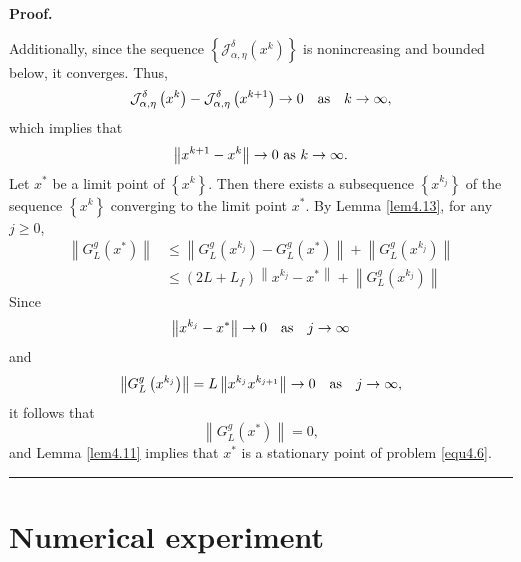 \documentclass[a4paper,12pt]{article}
\numberwithin{equation}{section}
\newenvironment{proof}[1][Proof]{\textbf{#1.} }
{\ \rule{0.75em}{0.75em}\smallskip}
\begin{document}
\begin{proof}
    \par Additionally, since the sequence $\left\{\mathcal{J}_{\alpha,\eta}^{\delta}\left(x^{k}\right)\right\}$ is nonincreasing and bounded below, it converges. Thus, 
    \begin{equation*}
        \mathcal{J}_{\alpha,\eta}^{\delta}\left(x^{k}\right)- \mathcal{J}_{\alpha,\eta}^{\delta}\left(x^{k+1}\right)\rightarrow 0\quad {\rm as}\quad  k\rightarrow \infty,
    \end{equation*}
    which implies that 
    \begin{equation*}
        \left\|x^{k+1}-x^{k}\right\|\rightarrow 0\ {\rm as}\ k\rightarrow\infty.
    \end{equation*}
    Let $x^{*}$ be a limit point of $\left\{x^{k}\right\}$. Then there exists a subsequence $\left\{x^{k_{j}}\right\}$ of the sequence $\left\{x^{k}\right\}$ converging to the limit point $x^{*}$. By Lemma \ref{lem4.13}, for any $j\geq 0$,
    \begin{align*}
        \left\|G_{L}^{g}\left(x^{*}\right)\right\|
        & \leq \left\|G_{L}^{g}\left(x^{k_{j}}\right)-G_{L}^{g}\left(x^{*}\right)\right\|+ \left\|G_{L}^{g}\left(x^{k_{j}}\right)\right\| \\
        & \leq \left(2L+L_{f}\right)\left\|x^{k_{j}}-x^{*}\right\| +\left\|G_{L}^{g}\left(x^{k_{j}}\right)\right\|
    \end{align*}
    Since 
    \begin{equation*}
        \left\|x^{k_{j}}-x^{*}\right\|\rightarrow 0\quad {\rm as}\quad j\rightarrow\infty
    \end{equation*}
    and 
    \begin{equation*}
        \left\|G_{L}^{g}\left(x^{k_{j}}\right)\right\|=L\left\|x^{k_{j}}x^{k_{j+1}}\right\| \rightarrow 0\quad {\rm as}\quad j\rightarrow\infty,
    \end{equation*}
    it follows that 
    \begin{equation*}
        \left\|G_{L}^{g}\left(x^{*}\right)\right\|=0,
    \end{equation*}
    and Lemma \ref{lem4.11} implies that $x^{*}$ is a stationary point of problem \eqref{equ4.6}.
\end{proof}


\section{Numerical experiment}\label{sec5}
\end{document}
